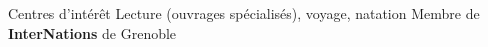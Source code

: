 \begin{rubric}{Centres d’intérêt}
\entry*[Loisirs] Lecture (ouvrages spécialisés), voyage, natation %
 Membre de \textbf{InterNations} de Grenoble
\end{rubric}


